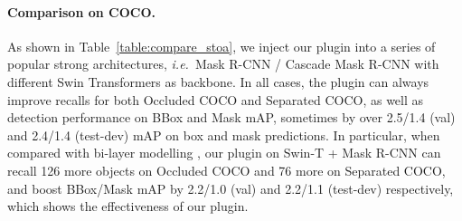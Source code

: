 \documentclass{bmvc2k}
\begin{document}
\paragraph{Comparison on COCO.} 
As shown in Table~\ref{table:compare_stoa},
we inject our plugin into a series of popular strong architectures, 
{\em i.e.}~Mask R-CNN / Cascade Mask R-CNN with different Swin Transformers as backbone. In all cases, the plugin can always improve recalls for both Occluded COCO and Separated COCO, as well as detection performance on BBox and Mask mAP, 
sometimes by over 2.5/1.4 (val) and 2.4/1.4 (test-dev) mAP on box and mask predictions. In particular, 
when compared with bi-layer modelling
,
our plugin on Swin-T + Mask R-CNN can recall 126 more objects on Occluded COCO and 76 more on Separated COCO, and boost BBox/Mask mAP by 2.2/1.0 (val) and 2.2/1.1 (test-dev) respectively,
which shows the effectiveness of our plugin. 
\end{document}
